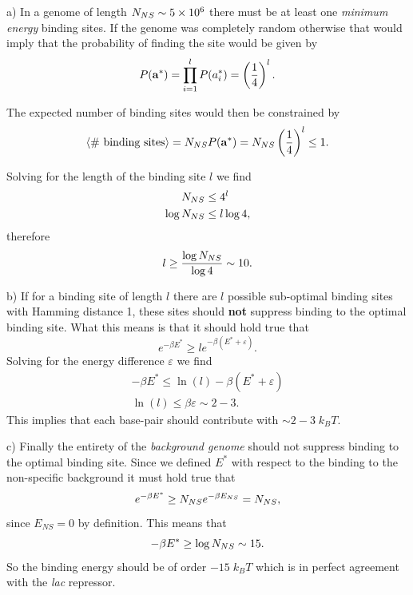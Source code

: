 a) In a genome of length $N_{NS} \sim 5\times 10^6$ there must be at least one
{\it minimum energy} binding sites. If the genome was completely random
otherwise that would imply that the probability of finding the site would be
given by
\begin{equation}
  P(\mathbf{a}^*) = \prod_{i=1}^l P(a_i^*) = \left( {1 \over 4} \right)^l.
\end{equation}

The expected number of binding sites would then be constrained by
\begin{equation}
  \left\langle \text{\# binding sites} \right\rangle = N_{NS} P(\mathbf{a}^*)
   = N_{NS} \left( {1 \over 4} \right)^l \leq 1.
\end{equation}

Solving for the length of the binding site $l$ we find
\begin{align}
  N_{NS} &\leq 4^l\\
  \log N_{NS} &\leq l \log 4,
\end{align}
therefore
\begin{equation}
  l \geq {\log N_{NS}\over \log 4} \sim 10.
\end{equation}

b) If for a binding site of length $l$ there are $l$ possible sub-optimal
binding sites with Hamming distance 1, these sites should \textbf{not} suppress
binding to the optimal binding site. What this means is that it should hold
true that
\begin{equation}
  e^{-\beta E^*} \geq l e^{-\beta (E^* + \varepsilon)}.
\end{equation}
Solving for the energy difference $\varepsilon$ we find
\begin{align}
  -\beta E^* \leq \ln (l) - \beta (E^* + \varepsilon)\\
  \ln (l) \leq \beta \varepsilon \sim 2-3.
\end{align}
This implies that each base-pair should contribute with $\sim 2-3 \; k_BT$.

c) Finally the entirety of the {\it background genome} should not suppress
binding to the optimal binding site. Since we defined $E^*$ with respect to the
binding to the non-specific background it must hold true that
\begin{equation}
  e^{-\beta E^*} \geq N_{NS} e^{-\beta E_{NS}} = N_{NS},
\end{equation}
since $E_{NS} = 0$ by definition.
This means that
\begin{equation}
  -\beta E^* \geq \log N_{NS} \sim 15.
\end{equation}
So the binding energy should be of order $-15 \; k_BT$ which is in perfect
agreement with the {\it lac} repressor.

